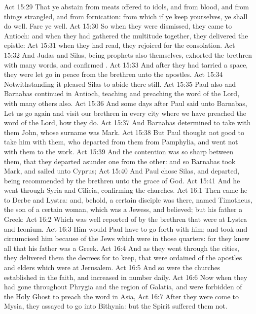 \vs Act 15:29 That ye abstain from meats offered to idols, and from blood, and from things strangled, and from fornication: from which if ye keep yourselves, ye shall do well. Fare ye well.
\vs Act 15:30 So when they were dismissed, they came to Antioch: and when they had gathered the multitude together, they delivered the epistle:
\vs Act 15:31  when they had read, they rejoiced for the consolation.
\vs Act 15:32 And Judas and Silas, being prophets also themselves, exhorted the brethren with many words, and confirmed .
\vs Act 15:33 And after they had tarried  a space, they were let go in peace from the brethren unto the apostles.
\vs Act 15:34 Notwithstanding it pleased Silas to abide there still.
\vs Act 15:35 Paul also and Barnabas continued in Antioch, teaching and preaching the word of the Lord, with many others also.
\vs Act 15:36 And some days after Paul said unto Barnabas, Let us go again and visit our brethren in every city where we have preached the word of the Lord,  how they do.
\vs Act 15:37 And Barnabas determined to take with them John, whose surname was Mark.
\vs Act 15:38 But Paul thought not good to take him with them, who departed from them from Pamphylia, and went not with them to the work.
\vs Act 15:39 And the contention was so sharp between them, that they departed asunder one from the other: and so Barnabas took Mark, and sailed unto Cyprus;
\vs Act 15:40 And Paul chose Silas, and departed, being recommended by the brethren unto the grace of God.
\vs Act 15:41 And he went through Syria and Cilicia, confirming the churches.
\vs Act 16:1 Then came he to Derbe and Lystra: and, behold, a certain disciple was there, named Timotheus, the son of a certain woman, which was a Jewess, and believed; but his father  a Greek:
\vs Act 16:2 Which was well reported of by the brethren that were at Lystra and Iconium.
\vs Act 16:3 Him would Paul have to go forth with him; and took and circumcised him because of the Jews which were in those quarters: for they knew all that his father was a Greek.
\vs Act 16:4 And as they went through the cities, they delivered them the decrees for to keep, that were ordained of the apostles and elders which were at Jerusalem.
\vs Act 16:5 And so were the churches established in the faith, and increased in number daily.
\vs Act 16:6 Now when they had gone throughout Phrygia and the region of Galatia, and were forbidden of the Holy Ghost to preach the word in Asia,
\vs Act 16:7 After they were come to Mysia, they assayed to go into Bithynia: but the Spirit suffered them not.
